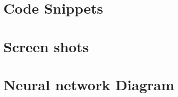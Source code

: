 \appendix


\section{ Code Snippets }
\section{ Screen shots }
\section{ Neural network Diagram }
 

\newpage
